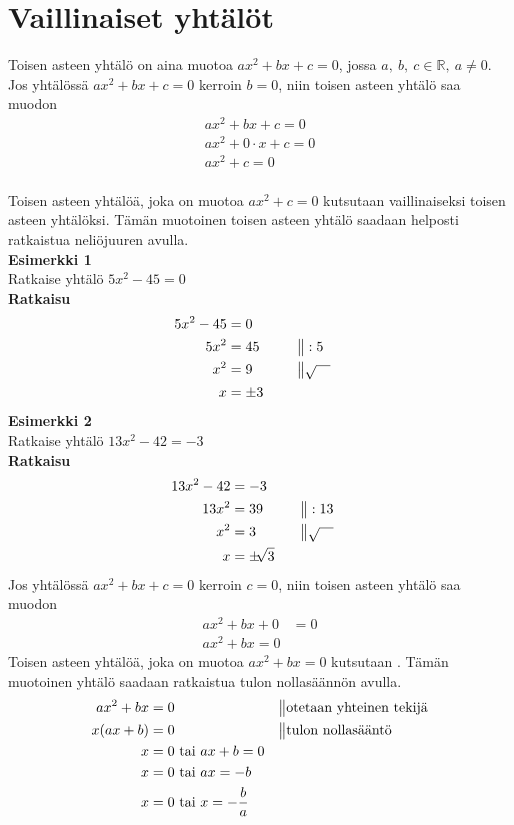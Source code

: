 \section{Vaillinaiset yhtälöt}
Toisen asteen yhtälö on aina muotoa $ax^2+bx+c=0$, jossa $a, \ b, \ c \in \mathbb{R}, \ a \neq 0$. \\
Jos yhtälössä $ax^2+bx+c=0$ kerroin $b=0$, niin toisen asteen yhtälö saa muodon
\begin{align*}
ax^2+bx+c=0 \\
ax^2+0 \cdot x+c=0 \\
ax^2+c=0
\end{align*}
 \\
    Toisen asteen yhtälöä, joka on muotoa $ax^2+c=0$ kutsutaan vaillinaiseksi toisen asteen yhtälöksi. Tämän muotoinen toisen asteen yhtälö saadaan helposti ratkaistua neliöjuuren avulla.\\
\textbf{Esimerkki 1} \\
Ratkaise yhtälö $5x^2-45=0$ \\
\textbf{Ratkaisu}
\begin{align*}
5x^2-45&=0 \\
5x^2&=45  \ \ \ \ \ &&\big\|:5 \\
x^2&=9 &&\big\| \sqrt{\quad} \\
x&= \pm 3
\end{align*}
\textbf{Esimerkki 2} \\
Ratkaise yhtälö $13x^2-42=-3$ \\
\textbf{Ratkaisu} \\
\begin{align*}
13x^2-42&=-3 \\
13x^2&=39 \ \ \ \ \ &&\big\|:13 \\
x^2&=3 \ \ \ \ \ &&\big\| \sqrt{\quad} \\
x&=\pm \sqrt[]{3}
\end{align*}
Jos yhtälössä $ax^2+bx+c=0$ kerroin $c=0$, niin toisen asteen yhtälö saa muodon
\begin{align*}
ax^2+bx+0&=0 \\
ax^2+bx=0
\end{align*}
Toisen asteen yhtälöä, joka on muotoa $ax^2+bx=0$ kutsutaan . Tämän muotoinen yhtälö saadaan ratkaistua tulon nollasäännön avulla. \\
\begin{align*}
ax^2+bx&=0 \ \ \ \ \ &&\big\|\text{otetaan yhteinen tekijä} \\
x(ax+b)&=0 \ \ \ \ \ &&\big\|\text{tulon nollasääntö} \\
x&=0 \text{ tai } ax+b=0 \\
x&=0 \text{ tai } ax=-b \\
x&=0 \text{ tai } x=-\frac{b}{a}
\end{align*}
